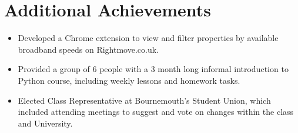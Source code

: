 \section{Additional Achievements}

\begin{itemize}
	\setlength\itemsep{0em}
	\item Developed a Chrome extension to view and filter properties by available broadband speeds on Rightmove.co.uk.
	\item Provided a group of 6 people with a 3 month long informal introduction to Python course, including weekly lessons and homework tasks. 
	\item Elected Class Representative at Bournemouth's Student Union, which included attending meetings to suggest and vote on changes within the class and University.
\end{itemize}